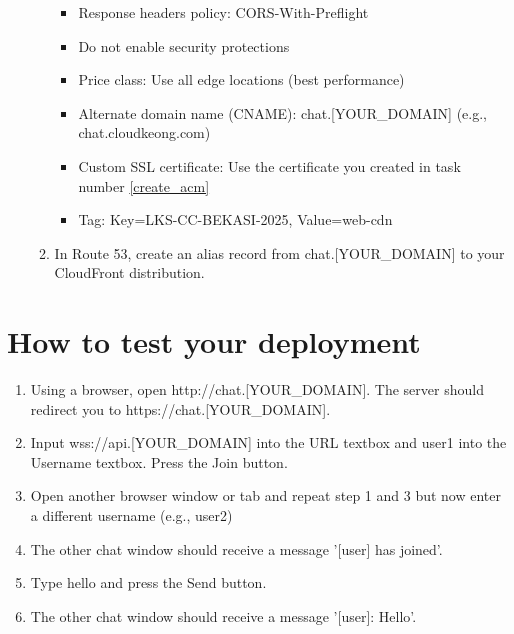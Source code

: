 \documentclass{article}
\begin{document}
\begin{enumerate}
\begin{enumerate}
\begin{itemize}
        \item Response headers policy: CORS-With-Preflight
        \item Do not enable security protections
        \item Price class: Use all edge locations (best performance)
        \item Alternate domain name (CNAME): chat.[YOUR\_DOMAIN] (e.g., chat.cloudkeong.com)
        \item Custom SSL certificate: Use the certificate you created in task number \ref{create_acm}
        \item Tag: Key=LKS-CC-BEKASI-2025, Value=web-cdn
      \end{itemize}
      \item In Route 53, create an alias record from chat.[YOUR\_DOMAIN] to your CloudFront distribution.
    \end{enumerate}
\end{enumerate}
\section{How to test your deployment}
\begin{enumerate}
  \item Using a browser, open http://chat.[YOUR\_DOMAIN]. The server should redirect you to https://chat.[YOUR\_DOMAIN].
  \item Input wss://api.[YOUR\_DOMAIN] into the URL textbox and user1 into the Username textbox. Press the Join button.
  \item Open another browser window or tab and repeat step 1 and 3 but now enter a different username (e.g., user2)
  \item The other chat window should receive a message '[user] has joined'.
  \item Type hello and press the Send button.
  \item The other chat window should receive a message '[user]: Hello'.
\end{enumerate}
\end{document}
